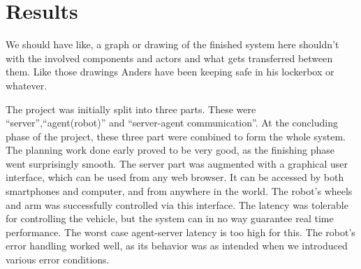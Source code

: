 \chapter{Results}
We should have like, a graph or drawing of the finished system here shouldn't with the involved components and actors and what gets transferred between them.
Like those drawings Anders have been keeping safe in his lockerbox or whatever.


The project was initially split into three parts. These were ``server'',``agent(robot)'' and ``server-agent communication''. 
At the concluding phase of the project, these three part were combined to form the whole system.
The planning work done early proved to be very good, as the finishing phase went surprisingly smooth. 
The server part was augmented with a graphical user interface, which can be used from any web browser. 
It can be accessed by both smartphones and computer, and from anywhere in the world. 
The robot's wheels and arm was successfully controlled via this interface. 
The latency was tolerable for controlling the vehicle, but the system can in no way guarantee real time performance.
The worst case agent-server latency is too high for this.
The robot's error handling worked well, as its behavior was as intended when we introduced various error conditions.


